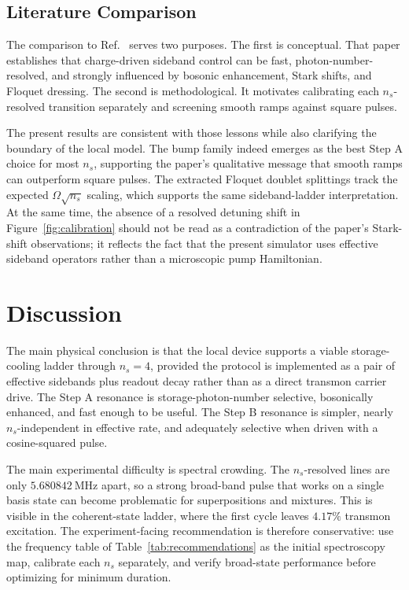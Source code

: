 \documentclass[aps,pra,twocolumn,reprint,floatfix,amsmath,amssymb]{revtex4-2}
\begin{document}
\subsection{Literature Comparison}
The comparison to Ref.~ serves two purposes. The first is conceptual. That paper establishes that charge-driven sideband control can be fast, photon-number-resolved, and strongly influenced by bosonic enhancement, Stark shifts, and Floquet dressing. The second is methodological. It motivates calibrating each \(n_s\)-resolved transition separately and screening smooth ramps against square pulses.

The present results are consistent with those lessons while also clarifying the boundary of the local model. The bump family indeed emerges as the best Step A choice for most \(n_s\), supporting the paper's qualitative message that smooth ramps can outperform square pulses. The extracted Floquet doublet splittings track the expected \(\Omega\sqrt{n_s}\) scaling, which supports the same sideband-ladder interpretation. At the same time, the absence of a resolved detuning shift in Figure~\ref{fig:calibration} should not be read as a contradiction of the paper's Stark-shift observations; it reflects the fact that the present simulator uses effective sideband operators rather than a microscopic pump Hamiltonian.

\section{Discussion}
\label{sec:discussion}
The main physical conclusion is that the local device supports a viable storage-cooling ladder through \(n_s=4\), provided the protocol is implemented as a pair of effective sidebands plus readout decay rather than as a direct transmon carrier drive. The Step A resonance is storage-photon-number selective, bosonically enhanced, and fast enough to be useful. The Step B resonance is simpler, nearly \(n_s\)-independent in effective rate, and adequately selective when driven with a cosine-squared pulse.

The main experimental difficulty is spectral crowding. The \(n_s\)-resolved lines are only \(5.680842~\si{\mega\hertz}\) apart, so a strong broad-band pulse that works on a single basis state can become problematic for superpositions and mixtures. This is visible in the coherent-state ladder, where the first cycle leaves \(4.17\%\) transmon excitation. The experiment-facing recommendation is therefore conservative: use the frequency table of Table~\ref{tab:recommendations} as the initial spectroscopy map, calibrate each \(n_s\) separately, and verify broad-state performance before optimizing for minimum duration.
\end{document}
